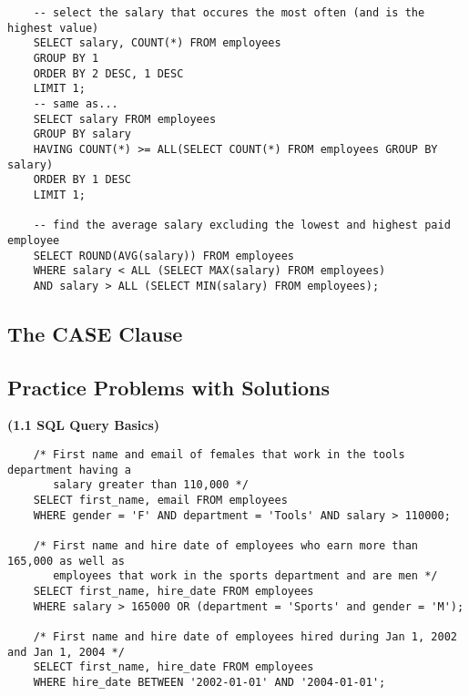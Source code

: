 \documentclass[11pt, a4paper]{article}
\begin{document}
\begin{spacing}{1.1}
\begin{lstlisting}
	-- select the salary that occures the most often (and is the highest value)
	SELECT salary, COUNT(*) FROM employees
	GROUP BY 1
	ORDER BY 2 DESC, 1 DESC
	LIMIT 1;
	-- same as...
	SELECT salary FROM employees
	GROUP BY salary
	HAVING COUNT(*) >= ALL(SELECT COUNT(*) FROM employees GROUP BY salary)
	ORDER BY 1 DESC
	LIMIT 1; 
	
	-- find the average salary excluding the lowest and highest paid employee
	SELECT ROUND(AVG(salary)) FROM employees
	WHERE salary < ALL (SELECT MAX(salary) FROM employees)
	AND salary > ALL (SELECT MIN(salary) FROM employees); \end{lstlisting} \vspace*{5mm}
	
	\subsection{The CASE Clause}
	
	
	
	
	
	
	
	
	
	
	
	
	
	
	
	
	
	\newpage 
	\subsection{Practice Problems with Solutions}
	\large \textbf{(1.1 SQL Query Basics)} \normalsize
	\begin{lstlisting}
	/* First name and email of females that work in the tools department having a 
	   salary greater than 110,000 */
	SELECT first_name, email FROM employees
	WHERE gender = 'F' AND department = 'Tools' AND salary > 110000;
	
	/* First name and hire date of employees who earn more than 165,000 as well as 
	   employees that work in the sports department and are men */
	SELECT first_name, hire_date FROM employees
	WHERE salary > 165000 OR (department = 'Sports' and gender = 'M');
	
	/* First name and hire date of employees hired during Jan 1, 2002 and Jan 1, 2004 */
	SELECT first_name, hire_date FROM employees
	WHERE hire_date BETWEEN '2002-01-01' AND '2004-01-01';
	

\end{lstlisting}
\end{spacing}
\end{document}
